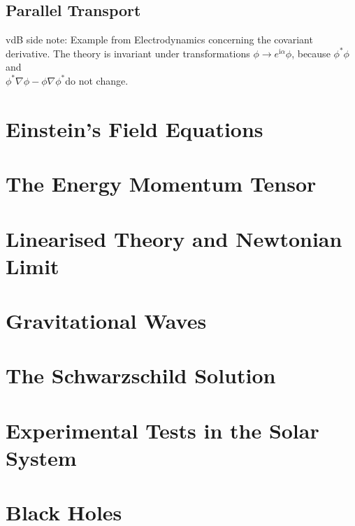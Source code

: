 \documentclass[
    a4paper,                                               %
    oneside,                                               %
    12pt,                                                  %
    headsepline,                                           %
    xcolor=dvipsnames
    ]{scrreprt}
\theoremstyle{definition}
\theoremstyle{remark}
\newcommand{\imI}{\ensuremath{\mathrm{i}}}
\begin{document}
		\section{Parallel Transport}
		vdB side note: Example from Electrodynamics concerning the covariant derivative. The theory is invariant under transformations $\phi\to e^{\imI \alpha}\phi$, because $\phi^*\phi$ and\\ $\phi^*\nabla\phi-\phi\nabla\phi^*$do not change.
    	\chapter{Einstein's Field Equations}
    	\chapter{The Energy Momentum Tensor}
    	\chapter{Linearised Theory and Newtonian Limit}
    	\chapter{Gravitational Waves}
    	\chapter{The Schwarzschild Solution}
    	\chapter{Experimental Tests in the Solar System}
    	\chapter{Black Holes}
\end{document}
